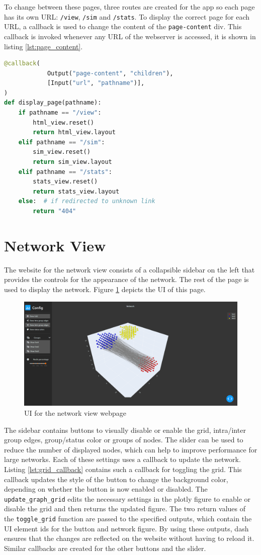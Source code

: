 To change between these pages, three routes are created for the app so each page has its own URL: \texttt{/view}, \texttt{/sim} and \texttt{/stats}. To display the correct page for each URL, a callback is used to change the content of the \texttt{page-content} div. This callback is invoked whenever any URL of the webserver is accessed, it is shown in listing \ref{lst:page_content}.
\begin{lstlisting}[language=python, caption={Create callback for page content}, label={lst:page_content}]
@callback(
            Output("page-content", "children"),
            [Input("url", "pathname")],
)
def display_page(pathname):
    if pathname == "/view":
        html_view.reset()
        return html_view.layout
    elif pathname == "/sim":
        sim_view.reset()
        return sim_view.layout
    elif pathname == "/stats":
        stats_view.reset()
        return stats_view.layout
    else:  # if redirected to unknown link
        return "404"
\end{lstlisting}

\section{Network View}
The website for the network view consists of a collapsible sidebar on the left that provides the controls for the appearance of the network. The rest of the page is used to display the network. Figure \ref{fig:web_network_view} depicts the UI of this page.

\begin{figure}
    \centering
    \includegraphics[width=0.5\linewidth]{images/web_network_view.png}
    \caption{UI for the network view webpage}
    \label{fig:web_network_view}
\end{figure}

The sidebar contains buttons to visually disable or enable the grid, intra/inter group edges, group/status color or groups of nodes. The slider can be used to reduce the number of displayed nodes, which can help to improve performance for large networks. Each of these settings uses a callback to update the network. Listing \ref{lst:grid_callback} contains such a callback for toggling the grid. This callback updates the style of the button to change the background color, depending on whether the button is now enabled or disabled. The \texttt{update\_graph\_grid} edits the necessary settings in the plotly figure to enable or disable the grid and then returns the updated figure. The two return values of the \texttt{toggle\_grid} function are passed to the specified outputs, which contain the UI element ids for the button and network figure. By using these outputs, dash ensures that the changes are reflected on the website without having to reload it. Similar callbacks are created for the other buttons and the slider.

